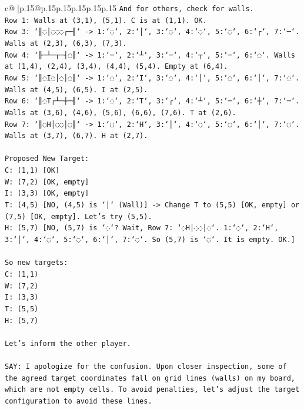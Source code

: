 \documentclass{article}
\begin{document}
{\begin{supertabular}{c@{$\;$}|p{.15\linewidth}@{}p{.15\linewidth}p{.15\linewidth}p{.15\linewidth}p{.15\linewidth}p{.15\linewidth}}
{{{\texttt{And for others, check for walls.} \\
\texttt{Row 1: Walls at (3,1), (5,1). C is at (1,1). OK.} \\
\texttt{Row 3: `║◌│◌◌◌┌─╢` {-}> 1:`◌`, 2:`│`, 3:`◌`, 4:`◌`, 5:`◌`, 6:`┌`, 7:`─`. Walls at (2,3), (6,3), (7,3).} \\
\texttt{Row 4: `╟─┴─┬─┤◌║` {-}> 1:`─`, 2:`┴`, 3:`─`, 4:`┬`, 5:`─`, 6:`◌`. Walls at (1,4), (2,4), (3,4), (4,4), (5,4). Empty at (6,4).} \\
\texttt{Row 5: `║◌I◌│◌│◌║` {-}> 1:`◌`, 2:`I`, 3:`◌`, 4:`│`, 5:`◌`, 6:`│`, 7:`◌`. Walls at (4,5), (6,5). I at (2,5).} \\
\texttt{Row 6: `║◌T┌┴─┼─╢` {-}> 1:`◌`, 2:`T`, 3:`┌`, 4:`┴`, 5:`─`, 6:`┼`, 7:`─`. Walls at (3,6), (4,6), (5,6), (6,6), (7,6). T at (2,6).} \\
\texttt{Row 7: `║◌H│◌◌│◌║` {-}> 1:`◌`, 2:`H`, 3:`│`, 4:`◌`, 5:`◌`, 6:`│`, 7:`◌`. Walls at (3,7), (6,7). H at (2,7).} \\
\\ 
\texttt{Proposed New Target:} \\
\texttt{C: (1,1) {[}OK{]}} \\
\texttt{W: (7,2) {[}OK, empty{]}} \\
\texttt{I: (3,3) {[}OK, empty{]}} \\
\texttt{T: (4,5) {[}NO, (4,5) is `│` (Wall){]} {-}> Change T to (5,5) {[}OK, empty{]} or (7,5) {[}OK, empty{]}. Let's try (5,5).} \\
\texttt{H: (5,7) {[}NO, (5,7) is `◌`? Wait, Row 7: `◌H│◌◌│◌`. 1:`◌`, 2:`H`, 3:`│`, 4:`◌`, 5:`◌`, 6:`│`, 7:`◌`. So (5,7) is `◌`. It is empty. OK.{]}} \\
\\ 
\texttt{So new targets:} \\
\texttt{C: (1,1)} \\
\texttt{W: (7,2)} \\
\texttt{I: (3,3)} \\
\texttt{T: (5,5)} \\
\texttt{H: (5,7)} \\
\\ 
\texttt{Let's inform the other player.} \\
\\ 
\texttt{SAY: I apologize for the confusion. Upon closer inspection, some of the agreed target coordinates fall on grid lines (walls) on my board, which are not empty cells. To avoid penalties, let's adjust the target configuration to avoid these lines.} \\
}}}
\end{supertabular}}
\end{document}
